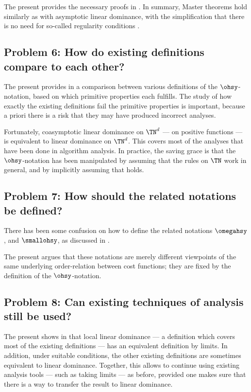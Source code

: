 \documentclass[b5paper, english, oneside]{memoir}
\begin{document}
The present \manuscript{} provides the necessary proofs in . In summary, Master theorems hold similarly as with asymptotic linear dominance, with the simplification that there is no need for so-called regularity conditions \cite{IntroAlgo2009}.

\subsection{Problem 6: How do existing definitions compare to each other?}

The present \manuscript{} provides in  a comparison between various definitions of the $\ohsy$-notation, based on which primitive properties each fulfills. The study of how exactly the existing definitions fail the primitive properties is important, because a priori there is a risk that they may have produced incorrect analyses. 

Fortunately, coasymptotic linear dominance on $\TN^d$ --- on positive functions --- is equivalent to linear dominance on $\TN^d$. This covers most of the analyses that have been done in algorithm analysis. In practice, the saving grace is that the $\ohsy$-notation has been manipulated by assuming that the rules on $\TN$ work in general, and by implicitly assuming that  holds. 

\subsection{Problem 7: How should the related notations be defined?}

There has been some confusion on how to define the related notations $\omegahsy$, and $\smallohsy$, as discussed in . 

The present \manuscript{} argues that these notations are merely different viewpoints of the same underlying order-relation between cost functions; they are fixed by the definition of the $\ohsy$-notation.

\subsection{Problem 8: Can existing techniques of analysis still be used?}

The present \manuscript{} shows in  that local linear dominance --- a definition which covers most of the existing definitions  --- has an equivalent definition by limits. In addition, under suitable conditions, the other existing definitions are sometimes equivalent to linear dominance. Together, this allows to continue using existing analysis tools --- such as taking limits --- as before, provided one makes sure that there is a way to transfer the result to linear dominance.
\end{document}
